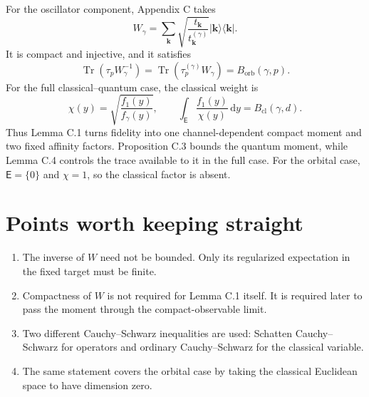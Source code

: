\documentclass[11pt]{article}
\newcommand{\Tr}{\operatorname{Tr}}
\newcommand{\dd}{\,\mathrm d}
\begin{document}
For the oscillator component, Appendix C takes
\[
  W_\gamma
  =\sum_{\mathbf k}
  \sqrt{\frac{t_{\mathbf k}}{t_{\mathbf k}^{(\gamma)}}}
  |\mathbf k\rangle\!\langle\mathbf k|.
\]
It is compact and injective, and it satisfies
\[
  \Tr(\tau_pW_\gamma^{-1})
  =\Tr(\tau_p^{(\gamma)}W_\gamma)
  =B_{\mathrm{orb}}(\gamma,p).
\]
For the full classical--quantum case, the classical weight is
\[
  \chi(y)=\sqrt{\frac{f_1(y)}{f_\gamma(y)}},
  \qquad
  \int_{\mathsf E}\frac{f_1(y)}{\chi(y)}\dd y
  =B_{\mathrm{cl}}(\gamma,d).
\]
Thus Lemma C.1 turns fidelity into one channel-dependent compact moment and
two fixed affinity factors.  Proposition C.3 bounds the quantum moment,
while Lemma C.4 controls the trace available to it in the full case.  For
the orbital case, $\mathsf E=\{0\}$ and $\chi=1$, so the classical factor is
absent.

\section{Points worth keeping straight}

\begin{enumerate}
  \item The inverse of $W$ need not be bounded.  Only its regularized
  expectation in the fixed target must be finite.
  \item Compactness of $W$ is not required for Lemma C.1 itself.  It is
  required later to pass the moment through the compact-observable limit.
  \item Two different Cauchy--Schwarz inequalities are used: Schatten
  Cauchy--Schwarz for operators and ordinary Cauchy--Schwarz for the
  classical variable.
  \item The same statement covers the orbital case by taking the classical
  Euclidean space to have dimension zero.
\end{enumerate}
\end{document}
